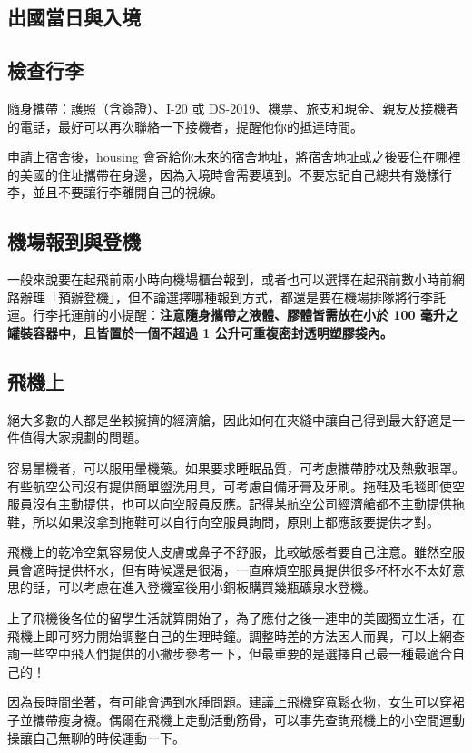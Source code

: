 \documentclass[10pt,a4paper]{book}
\begin{document}
\begin{CJK}{UTF8}{bkai}
\chapter{出國當日與入境}
\section{檢查行李}

隨身攜帶：護照（含簽證）、I-20 或 DS-2019、機票、旅支和現金、親友及接機者的電話，最好可以再次聯絡一下接機者，提醒他你的抵達時間。

申請上宿舍後，housing 會寄給你未來的宿舍地址，將宿舍地址或之後要住在哪裡的美國的住址攜帶在身邊，因為入境時會需要填到。不要忘記自己總共有幾樣行李，並且不要讓行李離開自己的視線。

\section{機場報到與登機}

一般來說要在起飛前兩小時向機場櫃台報到，或者也可以選擇在起飛前數小時前網路辦理「預辦登機」，但不論選擇哪種報到方式，都還是要在機場排隊將行李託運。行李托運前的小提醒：\textbf{注意隨身攜帶之液體、膠體皆需放在小於 100 毫升之罐裝容器中，且皆置於一個不超過 1 公升可重複密封透明塑膠袋內。}

\section{飛機上}

絕大多數的人都是坐較擁擠的經濟艙，因此如何在夾縫中讓自己得到最大舒適是一件值得大家規劃的問題。

容易暈機者，可以服用暈機藥。如果要求睡眠品質，可考慮攜帶脖枕及熱敷眼罩。有些航空公司沒有提供簡單盥洗用具，可考慮自備牙膏及牙刷。拖鞋及毛毯即使空服員沒有主動提供，也可以向空服員反應。記得某航空公司經濟艙都不主動提供拖鞋，所以如果沒拿到拖鞋可以自行向空服員詢問，原則上都應該要提供才對。

飛機上的乾冷空氣容易使人皮膚或鼻子不舒服，比較敏感者要自己注意。雖然空服員會適時提供杯水，但有時候還是很渴，一直麻煩空服員提供很多杯杯水不太好意思的話，可以考慮在進入登機室後用小銅板購買幾瓶礦泉水登機。

上了飛機後各位的留學生活就算開始了，為了應付之後一連串的美國獨立生活，在飛機上即可努力開始調整自己的生理時鐘。調整時差的方法因人而異，可以上網查詢一些空中飛人們提供的小撇步參考一下，但最重要的是選擇自己最一種最適合自己的！

因為長時間坐著，有可能會遇到水腫問題。建議上飛機穿寬鬆衣物，女生可以穿裙子並攜帶瘦身襪。偶爾在飛機上走動活動筋骨，可以事先查詢飛機上的小空間運動操讓自己無聊的時候運動一下。


\end{CJK}
\end{document}
